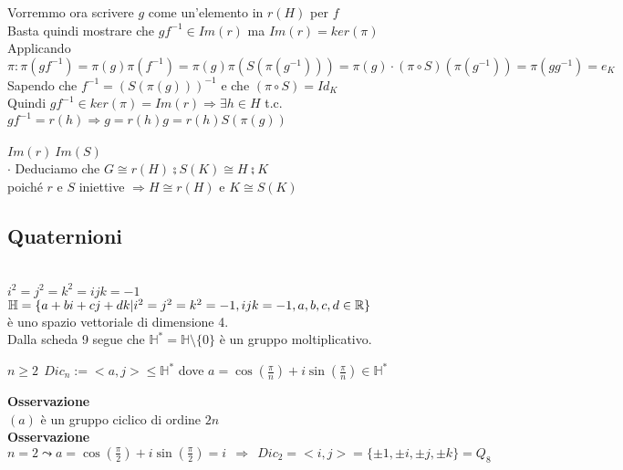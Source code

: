 \documentclass[12px]{article}
\begin{document}
	 Vorremmo ora scrivere $g$ come un'elemento in $r(H)$ per $f$\\
	 Basta quindi mostrare che  $gf^{-1}\in Im(r)$ ma  $Im(r) = ker(\pi)$\\
	 Applicando  $\pi: \pi(gf^{-1}) = \pi(g)\pi(f^{-1}) = \pi(g)\pi(S(\pi(g^{-1}))) = \pi(g)\cdot(\pi\circ S)(\pi(g^{-1}))= \pi(gg^{-1}) = e_K$\\
	 Sapendo che  $f^{-1} = (S(\pi(g)))^{-1}$ e che $(\pi\circ S) = Id_K$\\
	 Quindi  $gf^{-1}\in ker(\pi) = Im(r) \Rightarrow \exists h\in H$ t.c. $gf^{-1} = r(h) \Rightarrow g = r(h)g = r(h)S(\pi(g))$ \\
	 \text{ }\storto \ni \ \ \ \ \ \storto\ni\\
	 $Im(r) \  Im(S)$ \\
	 $\cdot$ Deduciamo che $G\cong r(H)\semi S(K)\cong H\semi K$\\
	 poiché  $r$ e $S$  iniettive $ \Rightarrow H\cong r(H)$ e $ K\cong S(K)$
	 \subsection{Quaternioni}\\
	 $i^2 = j^2 = k^2 = ijk = -1$\\
	 $\mathbb H = \{a + bi + cj + dk | i^2 = j^2 = k^2 = -1, ijk = -1, a,b,c,d\in \mathbb{R}\}$\\
	 è uno spazio vettoriale di dimensione 4. \\
	 Dalla scheda 9 segue che  $\mathbb H^* = \mathbb H\setminus\{0\}$ è un gruppo moltiplicativo.\\
	 \begin{defi}
	 	$n\geq 2 \ \ Dic_n:= <a,j> \leq \mathbb H^*$ dove  $a = \cos(\frac \pi n) + i\sin(\frac \pi n)\in \mathbb H^*$
	 \end{defi}
	 \textbf{Osservazione}\\
	 $(a)$ è un gruppo ciclico di ordine $2n$\\
	  \textbf{Osservazione}\\
	  $n = 2 \leadsto a = \cos(\frac \pi 2 ) + i \sin (\frac \pi 2) = i \ \ \Rightarrow  \ \ Dic_2 = <i,j> = \{\pm 1,\pm i, \pm j,\pm k\} = Q_8$ \\
\end{document}
